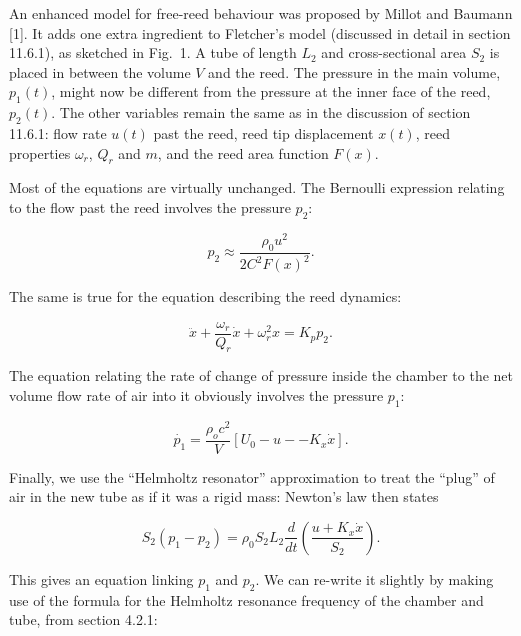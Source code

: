   An enhanced model for free-reed behaviour was proposed by Millot and Baumann 
  [1]. It adds one extra ingredient to Fletcher's model (discussed in detail in 
  section 11.6.1), as sketched in Fig.\ 1. A tube of length $L_2$ and 
  cross-sectional area $S_2$ is placed in between the volume $V$ and the reed. 
  The pressure in the main volume, $p_1(t)$, might now be different from the 
  pressure at the inner face of the reed, $p_2(t)$. The other variables remain 
  the same as in the discussion of section 11.6.1: flow rate $u(t)$ past the 
  reed, reed tip displacement $x(t)$, reed properties $\omega_r$, $Q_r$ and 
  $m$, and the reed area function $F(x)$. 


  Most of the equations are virtually unchanged. The Bernoulli expression 
  relating to the flow past the reed involves the pressure $p_2$: 

  \begin{equation*}p_2 \approx \dfrac{\rho_0 u^2}{2 C^2 F(x)^2} . 
  \tag{1}\end{equation*} 

  The same is true for the equation describing the reed dynamics: 

  \begin{equation*}\ddot{x}+\dfrac{\omega_r}{Q_r}\dot{x}+\omega_r^2 x = K_p p_2 
  . \tag{2}\end{equation*} 

  The equation relating the rate of change of pressure inside the chamber to 
  the net volume flow rate of air into it obviously involves the pressure 
  $p_1$: 

  \begin{equation*}\dot{p_1}=\dfrac{\rho_o c^2}{V}[U_0 -u -- K_x \dot{x}] . 
  \tag{3}\end{equation*} 

  Finally, we use the ``Helmholtz resonator'' approximation to treat the 
  ``plug'' of air in the new tube as if it was a rigid mass: Newton's law then 
  states 

  \begin{equation*}S_2(p_1-p_2)=\rho_0 S_2 L_2\dfrac{d}{dt}\left(\dfrac{u+K_x 
  \dot{x}}{S_2} \right) . \tag{4}\end{equation*} 

  This gives an equation linking $p_1$ and $p_2$. We can re-write it slightly 
  by making use of the formula for the Helmholtz resonance frequency of the 
  chamber and tube, from section 4.2.1: 

